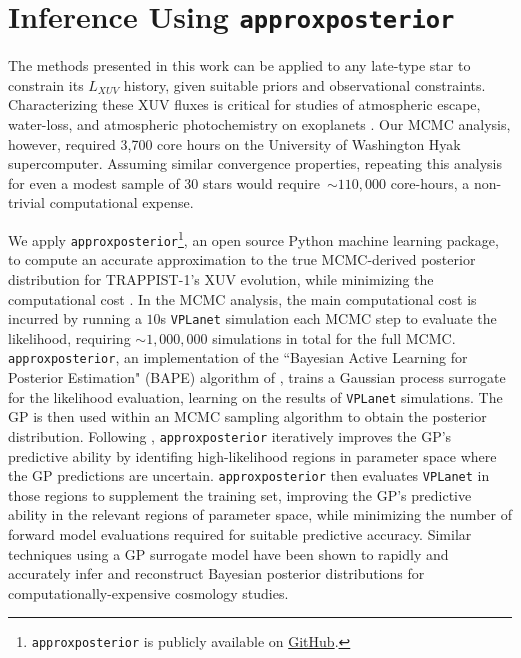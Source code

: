 \documentclass[twocolumn]{aastex62}
\newcommand{\vplanet}[0]{\texttt{VPLanet}\xspace}
\newcommand{\approxposterior}[0]{\texttt{approxposterior}\xspace}
\begin{document}

\section{Inference Using \approxposterior} \label{sec:approx}

The methods presented in this work can be applied to any late-type star to constrain its $L_{XUV}$ history, given suitable priors and observational constraints. Characterizing these XUV fluxes is critical for studies of atmospheric escape, water-loss, and atmospheric photochemistry on exoplanets \citep[e.g.][]{Lammer2003,Ribas2005,MurrayClay2009,Luger2015,Airapetian2019}. Our MCMC analysis, however, required 3,700 core hours on the University of Washington Hyak supercomputer. Assuming similar convergence properties, repeating this analysis for even a modest sample of 30 stars would require~${\sim} 110,000$ core-hours, a non-trivial computational expense. 


We apply \approxposterior\footnote{\approxposterior is publicly available on \href{https://github.com/dflemin3/approxposterior}{GitHub}.}, an open source Python machine learning package, to compute an accurate approximation to the true MCMC-derived posterior distribution for TRAPPIST-1's XUV evolution, while minimizing the computational cost \citep{FlemingVanderPlas2018}. In the MCMC analysis, the main computational cost is incurred by running a $10$s \vplanet simulation each MCMC step to evaluate the likelihood, requiring ${\sim}1,000,000$ simulations in total for the full MCMC. \approxposterior, an implementation of the ``Bayesian Active Learning for Posterior Estimation" (BAPE) algorithm of \citet{Kandasamy2015}, trains a Gaussian process \citep[GP, ][]{Rasmussen2006} surrogate for the likelihood evaluation, learning on the results of \vplanet simulations. The GP is then used within an MCMC sampling algorithm to obtain the posterior distribution. Following \citet{Kandasamy2015}, \approxposterior iteratively improves the GP's predictive ability by identifing high-likelihood regions in parameter space where the GP predictions are uncertain. \approxposterior then evaluates \vplanet in those regions to supplement the training set, improving the GP's predictive ability in the relevant regions of parameter space, while minimizing the number of forward model evaluations required for suitable predictive accuracy. Similar techniques using a GP surrogate model have been shown to rapidly and accurately infer \citep[e.g.][]{Bird2019,Rogers2019,Takhtaganov2019} and reconstruct \citep{McClintock2019} Bayesian posterior distributions for computationally-expensive cosmology studies.
\end{document}
